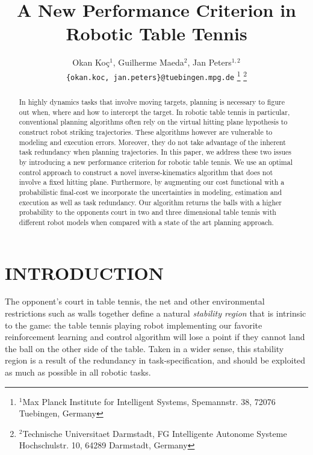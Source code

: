 \documentclass[letterpaper, 10 pt, conference]{ieeeconf}
\author{Okan Ko\c c$^{1}$, Guilherme Maeda$^{2}$, Jan Peters$^{1,2}$%
\\
{\tt\small \{okan.koc, jan.peters\}@tuebingen.mpg.de}%
\thanks{$^{1}$Max Planck Institute for Intelligent Systems,
        Spemannstr. 38, 72076 Tuebingen, Germany}
\thanks{$^{2}$Technische Universitaet Darmstadt, FG Intelligente Autonome Systeme
        Hochschulstr. 10, 64289 Darmstadt, Germany}
}
\title{A New Performance Criterion in Robotic Table Tennis}
\newcommand{\court}{\mathcal{S}} %
\begin{document}
\maketitle
\thispagestyle{empty}
\pagestyle{empty}

\begin{abstract}

In highly dynamics tasks that involve moving targets, planning is necessary to figure out when, where and how to intercept the target. In robotic table tennis in particular, conventional planning algorithms often rely on the virtual hitting plane hypothesis to construct robot striking trajectories. These algorithms however are vulnerable to modeling and execution errors. %
Moreover, they do not take advantage of the inherent task redundancy when planning trajectories. In this paper, we address these two issues by introducing a new performance criterion for robotic table tennis. We use an optimal control approach to construct a novel inverse-kinematics algorithm that does not involve a fixed hitting plane. Furthermore, by augmenting our cost functional with a probabilistic final-cost we incorporate the uncertainties in modeling, estimation and execution as well as task redundancy. Our algorithm returns the balls with a higher probability to the opponents court in two and three dimensional table tennis with different robot models when compared with a state of the art planning approach. 



\end{abstract}


%
%
%
%

\section{INTRODUCTION}

The opponent's court in table tennis, the net and other environmental restrictions such as walls together define a natural \emph{stability region} that is intrinsic to the game: the table tennis playing robot implementing our favorite reinforcement learning and control algorithm will lose a point if they cannot land the ball on the other side of the table. Taken in a wider sense, this stability region is a result of the redundancy in task-specification, and should be exploited as much as possible in all robotic tasks. 
\end{document}
